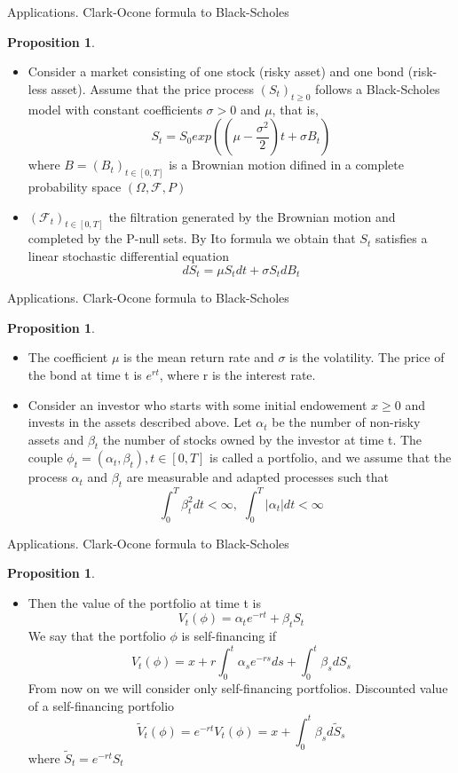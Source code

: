 \documentclass{beamer}%
\theoremstyle{definition}
\newtheorem{proposition}[theorem]{Proposition}
\begin{document}
\begin{frame}{Applications. Clark-Ocone formula to Black-Scholes}
\begin{proposition}
\begin{itemize}

\item Consider a market consisting of one stock (risky asset) and one bond (risk-less asset). Assume that the price process $(S_t)_{t\ge0}$ follows a Black-Scholes model with constant coefficients $\sigma > 0$ and $\mu$, that is, 
$$S_t = S_0exp\left(\left(\mu - \dfrac{\sigma^2}{2}\right)t + \sigma B_t\right)$$
where $B = (B_t)_{t \in [0, T]}$ is a Brownian motion difined in a complete probability space $(\Omega, \mathcal{F}, P)$ 
\item $(\mathcal{F}_t)_{t \in [0, T]}$ the filtration generated by the Brownian motion and completed by the P-null sets. By Ito formula we obtain that $S_t$ satisfies a linear stochastic differential equation $$dS_t = \mu S_tdt + \sigma S_t dB_t$$
\end{itemize}
\end{proposition}
\end{frame}

\begin{frame}{Applications. Clark-Ocone formula to Black-Scholes}
\begin{proposition}
\begin{itemize}

\item The coefficient $\mu$ is the mean return rate and $\sigma$ is the volatility. The price of the bond at time t is $e^{rt}$, where r is the interest rate. 
\item Consider an investor who starts with some initial endowement $x \ge 0$ and invests in the assets described above. Let $\alpha_t$ be the number of non-risky assets and $\beta_t$ the number of stocks owned by the investor at time t. The couple $\phi_t = (\alpha_t, \beta_t), t \in [0, T]$ is called a portfolio, and we assume that the process $\alpha_t$ and $\beta_t$ are measurable and adapted processes such that 
$$\int_0^{T}\beta_t^2 dt < \infty, \,\, \int_0^{T}|\alpha_t| dt < \infty$$
\end{itemize}
\end{proposition}
\end{frame}

\begin{frame}{Applications. Clark-Ocone formula to Black-Scholes}
\begin{proposition}
\begin{itemize}

\item Then the value of the portfolio at time t is 
$$V_t(\phi) = \alpha_t e^{-rt} + \beta_t S_t$$
We say that the portfolio $\phi$ is self-financing if
$$V_t(\phi) = x + r\int_0^{t}\alpha_s e^{-rs}ds + \int_{0}^t\beta_s dS_s$$
From now on we will consider only self-financing portfolios. Discounted value of a self-financing portfolio
$$\tilde{V}_t(\phi) = e^{-rt}V_t(\phi) = x + \int_{0}^t\beta_s d\tilde{S}_s$$
where $\tilde{S}_t = e^{-rt} S_t$
\end{itemize}
\end{proposition}
\end{frame}
\end{document}
